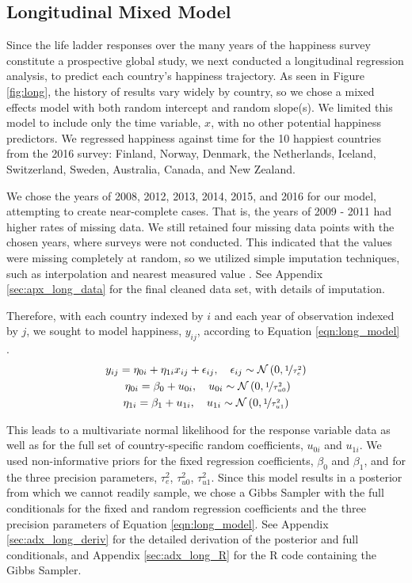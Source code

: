 \documentclass{article}
\begin{document}
\subsection{Longitudinal Mixed Model}
Since the life ladder responses over the many years of the happiness survey constitute a prospective global study, we next conducted a longitudinal regression analysis, to predict each country's happiness trajectory. As seen in Figure \ref{fig:long}, the history of results vary widely by country, so we chose a mixed effects model with both random intercept and random slope(s). We limited this model to include only the time variable, $x$, with no other potential happiness predictors. We regressed happiness against time for the 10 happiest countries from the 2016 survey: Finland, Norway, Denmark, the Netherlands, Iceland, Switzerland, Sweden, Australia, Canada, and New Zealand.

We chose the years of 2008, 2012, 2013, 2014, 2015, and 2016 for our model, attempting to create near-complete cases. That is, the years of 2009 - 2011 had higher rates of missing data. We still retained four missing data points with the chosen years, where surveys were not conducted. This indicated that the values were missing completely at random, so we utilized simple imputation techniques, such as interpolation and nearest measured value \cite{gelman_hill_2016}. See Appendix \ref{sec:apx_long_data} for the final cleaned data set, with details of imputation.

Therefore, with each country indexed by $i$ and each year of observation indexed by $j$, we sought to model happiness, $y_{ij}$, according to Equation \ref{eqn:long_model} \cite{rolfe_2010}.
\begin{equation}
\begin{gathered} \label{eqn:long_model}
y_{ij}=\eta_{0i}+\eta_{1i}x_{ij}+\epsilon_{ij}, \quad \epsilon_{ij} \sim \mathcal{N} \left( 0, \nicefrac{1}{\tau_e^2} \right) \\\ 
\eta_{0i} = \beta_{0} + u_{0i}, \quad u_{0i} \sim \mathcal{N} \left( 0, \nicefrac{1}{\tau_{u0}^2} \right) \\
\eta_{1i} = \beta_{1} + u_{1i}, \quad u_{1i} \sim \mathcal{N} \left( 0, \nicefrac{1}{\tau_{u1}^2} \right) \\
\end{gathered}
\end{equation}

This leads to a multivariate normal likelihood for the response variable data as well as for the full set of country-specific random coefficients, $u_{0i}$ and $u_{1i}$. We used non-informative priors for the fixed regression coefficients, $\beta_0$ and $\beta_1$, and for the three precision parameters, $\tau_{e}^2$, $\tau_{u0}^2$, $\tau_{u1}^2$. Since this model results in a posterior from which we cannot readily sample, we chose a Gibbs Sampler with the full conditionals for the fixed and random regression coefficients and the three precision parameters of Equation \ref{eqn:long_model}. See Appendix \ref{sec:adx_long_deriv} for the detailed derivation of the posterior and full conditionals, and Appendix \ref{sec:adx_long_R} for the R code containing the Gibbs Sampler.
\end{document}
